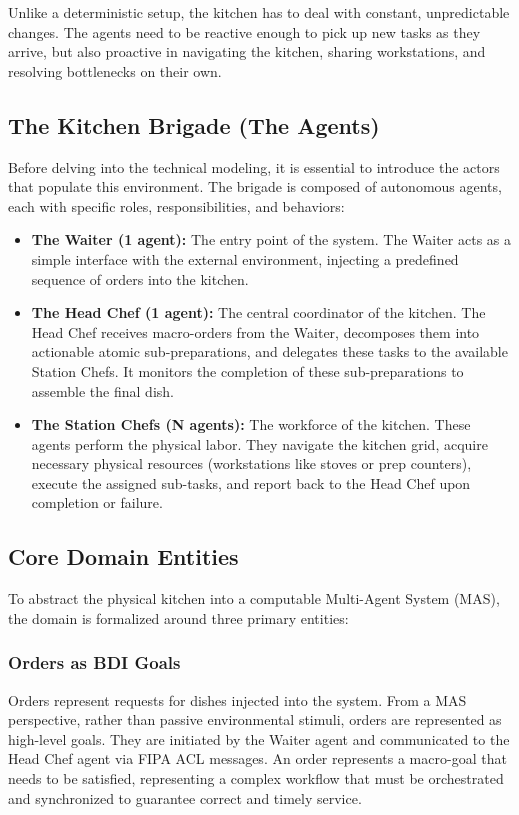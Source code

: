 \documentclass{scrartcl}
\begin{document}
Unlike a deterministic setup, the kitchen has to deal with constant, unpredictable changes. The agents need to be reactive enough to pick up new tasks as they arrive, but also proactive in navigating the kitchen, sharing workstations, and resolving bottlenecks on their own.

\subsection{The Kitchen Brigade (The Agents)}

Before delving into the technical modeling, it is essential to introduce the actors that populate this environment. The brigade is composed of autonomous agents, each with specific roles, responsibilities, and behaviors:

\begin{itemize}
\item \textbf{The Waiter (1 agent):} The entry point of the system. The Waiter acts as a simple interface with the external environment, injecting a predefined sequence of orders into the kitchen.
\item \textbf{The Head Chef (1 agent):} The central coordinator of the kitchen. The Head Chef receives macro-orders from the Waiter, decomposes them into actionable atomic sub-preparations, and delegates these tasks to the available Station Chefs. It monitors the completion of these sub-preparations to assemble the final dish.
\item \textbf{The Station Chefs (N agents):} The workforce of the kitchen. These agents perform the physical labor. They navigate the kitchen grid, acquire necessary physical resources (workstations like stoves or prep counters), execute the assigned sub-tasks, and report back to the Head Chef upon completion or failure.
\end{itemize}


\subsection{Core Domain Entities}

To abstract the physical kitchen into a computable Multi-Agent System (MAS), the domain is formalized around three primary entities:

\subsubsection{Orders as BDI Goals}
Orders represent requests for dishes injected into the system. From a MAS perspective, rather than passive environmental stimuli, orders are represented as high-level goals. They are initiated by the Waiter agent and communicated to the Head Chef agent via FIPA ACL messages. An order represents a macro-goal that needs to be satisfied, representing a complex workflow that must be orchestrated and synchronized to guarantee correct and timely service.
\end{document}
